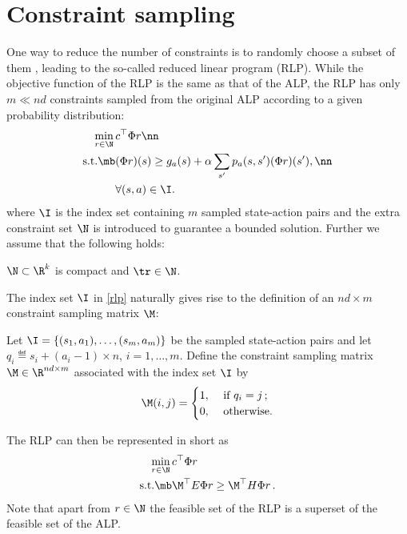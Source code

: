 \section{Constraint sampling}
One way to reduce the number of constraints is to randomly choose a subset of them \cite{CS},
leading to the so-called reduced linear program (RLP). 
While the objective function of the RLP is the same as that of the ALP, 
the RLP has only $m \ll nd$ constraints sampled from the original ALP according to a given probability distribution:
\begin{align}\label{rlp}
\min_{r\in \N}\, &c^\top \Phi r\nn\\
\text{s.t.}\mb &(\Phi r)(s)\geq g_a(s)+\alpha\sum_{s'}p_a(s,s')(\Phi r)(s'), \nn\\
&\forall (s,a) \in \I.
\end{align}
where $\I$ is the index set containing $m$ sampled state-action pairs and the extra constraint set $\N$ is introduced to guarantee a bounded solution. Further we assume that the following holds:
\begin{assumption}\label{nassump}
$\N \subset \R^k$ is compact and $\tr \in \N$.
\end{assumption}
The index set $\I$ in \eqref{rlp} naturally gives rise to the definition of an $nd\times m$ constraint sampling matrix $\M$:
\begin{definition}\label{csampmat}
Let $\I=\{(s_1,a_1),\ldots,(s_m,a_m)\}$ be the sampled state-action pairs and let $q_i \eqdef s_i+(a_i-1)\times n$, $i=1,\ldots,m$. Define the constraint sampling matrix $\M \in \R^{nd\times m}$ associated with the index set $\I$ by
\begin{align}
\M(i,j)
=
\begin{cases}
1, & \text{ if } q_i = j\,;\\
0, & \text{ otherwise}.
\end{cases}
\end{align}
\end{definition}
The RLP can then be represented in short as
\begin{align}\label{rlpshort}
\begin{split}
\min_{r\in \N}\, &c^\top \Phi r\\
\text{s.t.}\mb & \M^\top E \Phi r \geq \M^\top H \Phi r\,.
\end{split}
\end{align}
Note that apart from $r\in \N$ the feasible set of the RLP is a superset of the feasible set of the ALP.

